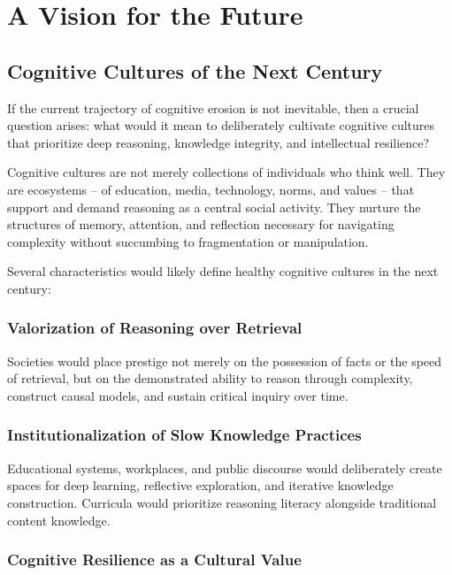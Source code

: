 \chapter{A Vision for the Future}

\section{Cognitive Cultures of the Next Century}

If the current trajectory of cognitive erosion is not inevitable, then a
crucial question arises: what would it mean to deliberately cultivate
cognitive cultures that prioritize deep reasoning, knowledge integrity,
and intellectual resilience?

Cognitive cultures are not merely collections of individuals who think
well. They are ecosystems -- of education, media, technology, norms, and
values -- that support and demand reasoning as a central social activity.
They nurture the structures of memory, attention, and reflection
necessary for navigating complexity without succumbing to fragmentation
or manipulation.

Several characteristics would likely define healthy cognitive cultures
in the next century:

\subsection{Valorization of Reasoning over Retrieval}

Societies would place prestige not merely on the possession of facts or
the speed of retrieval, but on the demonstrated ability to reason
through complexity, construct causal models, and sustain critical
inquiry over time.

\subsection{Institutionalization of Slow Knowledge Practices}

Educational systems, workplaces, and public discourse would deliberately
create spaces for deep learning, reflective exploration, and iterative
knowledge construction. Curricula would prioritize reasoning literacy
alongside traditional content knowledge.

\subsection{Cognitive Resilience as a Cultural Value}


